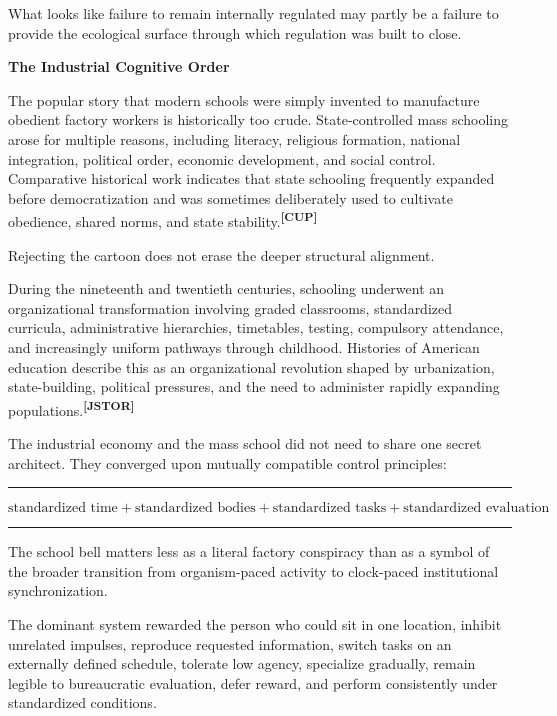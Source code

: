 \documentclass[10pt]{article}
\newcommand{\ActiveAccent}{Industrial}
\newcommand{\papersection}[2]{%
  \Needspace{8\baselineskip}
  \vspace{1.1em}
  \noindent\begin{minipage}[t]{0.12\textwidth}
    \vspace{1pt}{\sffamily\bfseries\fontsize{17}{17}\selectfont\textcolor{\ActiveAccent}{#1}}
  \end{minipage}%
  \begin{minipage}[t]{0.86\textwidth}
    {\sffamily\bfseries\fontsize{16.2}{19}\selectfont #2}\par
    \vspace{0.35em}{\color{\ActiveAccent}\rule{\linewidth}{1.15pt}}
  \end{minipage}
  \vspace{0.55em}
}
\newcommand{\sourcecue}[1]{\textsuperscript{\sffamily\bfseries\fontsize{6.5}{7}\selectfont\textcolor{\ActiveAccent}{[#1]}}}
\newenvironment{equationpanel}{\begin{center}\begin{minipage}{0.92\linewidth}\color{\ActiveAccent}\rule{\linewidth}{0.55pt}\par\vspace{-0.25em}\color{Ink}}{\vspace{-0.10em}\par\color{\ActiveAccent}\rule{\linewidth}{0.55pt}\end{minipage}\end{center}}
\begin{document}
What looks like failure to remain internally regulated may partly be a failure to provide the ecological surface through which regulation was built to close.

\papersection{III}{The Industrial Cognitive Order}

The popular story that modern schools were simply invented to manufacture obedient factory workers is historically too crude. State-controlled mass schooling arose for multiple reasons, including literacy, religious formation, national integration, political order, economic development, and social control. Comparative historical work indicates that state schooling frequently expanded before democratization and was sometimes deliberately used to cultivate obedience, shared norms, and state stability.\sourcecue{CUP}

Rejecting the cartoon does not erase the deeper structural alignment.

During the nineteenth and twentieth centuries, schooling underwent an organizational transformation involving graded classrooms, standardized curricula, administrative hierarchies, timetables, testing, compulsory attendance, and increasingly uniform pathways through childhood. Histories of American education describe this as an organizational revolution shaped by urbanization, state-building, political pressures, and the need to administer rapidly expanding populations.\sourcecue{JSTOR}

The industrial economy and the mass school did not need to share one secret architect. They converged upon mutually compatible control principles:

\begin{equationpanel}
\begin{equation*}
\text{standardized time} + \text{standardized bodies} + \text{standardized tasks} + \text{standardized evaluation}
\end{equation*}
\end{equationpanel}

The school bell matters less as a literal factory conspiracy than as a symbol of the broader transition from organism-paced activity to clock-paced institutional synchronization.

The dominant system rewarded the person who could sit in one location, inhibit unrelated impulses, reproduce requested information, switch tasks on an externally defined schedule, tolerate low agency, specialize gradually, remain legible to bureaucratic evaluation, defer reward, and perform consistently under standardized conditions.
\end{document}
